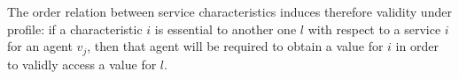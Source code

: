 \documentclass[compsoc, conference, letterpaper, 10pt, times]{IEEEtran}
\newtheorem{definition}{Definition}
\begin{document}
The order relation between service characteristics induces therefore validity under profile: if a characteristic $i$ is essential to another one $l$ with respect to a service $i$ for an agent $v_{j}$, then that agent will be required to obtain a value for  $i$ in order to validly access a value for $l$. 

%
\end{document}
